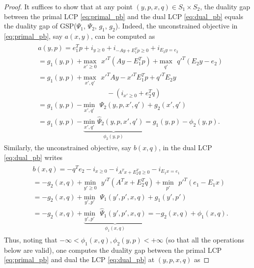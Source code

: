 \documentclass{article}
\begin{document}
\begin{proof}
It suffices to show that at any point $(y, p, x,
q) \in S_1 \times S_2$, the duality gap between the primal
LCP \eqref{eq:primal_pb} and the dual LCP \eqref{eq:dual_pb} equals
the duality gap of GSP($\Psi_1$, $\Psi_2$, $g_1$, $g_2$).
Indeed, the unconstrained objective in \eqref{eq:primal_pb}, say
$a(x,y)$, can be computed as
\begin{eqnarray*}
  \begin{aligned}
    &a(y,p) = e_1^Tp + i_{y\ge 0} + i_{-Ay + E_1^Tp \ge 0} +
    i_{E_2y = e_2}\\
    &= g_1(y,p) + \underset{x' \geq
      0}{\text{max}}\text{ }x'^T(Ay - E_1^Tp) +
    \underset{q'}{\text{max}}\text{ }q'^T(E_2y - e_2)\\
    &= g_1(y,p) + \underset{x',
      q'}{\text{max}}\text{ }x'^TAy - x'^T
    E_1^Tp + q'^TE_2y\\
    &\hspace{10em}-
    (i_{x' \ge 0} + e_2^Tq)\\
    &= g_1(y,p)
      - \underset{x',q'}{\text{min}}\text{ }\Psi_2(y, p, x', q') + g_2(x',
      q')\\
      &= g_1(y,p)
      - \underbrace{\underset{x',q'}{\text{min}}\text{
        }\hat{\Psi}_2(y, p, x', q')}_{\phi_2(y,p)}
      = g_1(y, p) - \phi_2(y, p).
  \end{aligned}
  \label{eq:a}
\end{eqnarray*}
Similarly, the unconstrained objective, say
$b(x, q)$, in the dual LCP \eqref{eq:dual_pb} writes
\begin{eqnarray*}
  \begin{aligned}
&b(x, q) = 
-q^Te_2 -i_{x \ge 0} - i_{A^Tx+E_2^Tq \ge 0} -
 i_{E_1x = e_1}\\
 &= -g_2(x, q) + \underset{y' \geq
   0}{\text{min}}\text{ }y'^T(A^Tx + E_2^Tq) +
 \underset{p'}{\text{min}}\text{ }p'^T(e_1-E_1x)\\
    &= -g_2(x, q)
 +\underset{y',p'}{\text{min}}\text{ }\Psi_1(y', p', x, q) +
 g_1(y', p')\\
& = -g_2(x, q) +
 \underbrace{\underset{y',p'}{\text{min}}\text{ }\hat{\Psi}_1(y', p',
   x, q)}_{\phi_1(x, q)} = -g_2(x, q) + \phi_1(x, q). 
   \end{aligned}
\end{eqnarray*}
Thus, noting that $-\infty < \phi_1(x, q), \phi_2(y, p) < +\infty$
(so that all the operations below are valid),
one computes the duality gap between the primal LCP
\eqref{eq:primal_pb} and dual the LCP \eqref{eq:dual_pb} at $(y, p, x, q)$ as

\end{proof}
\end{document}

